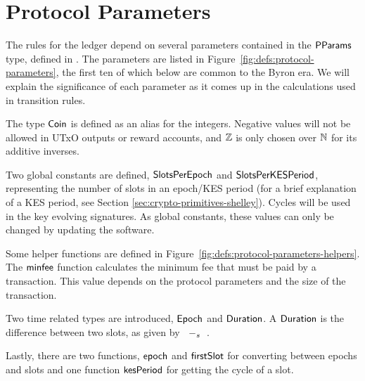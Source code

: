 \section{Protocol Parameters}
\label{sec:protocol-parameters}

The rules for the ledger depend on several parameters contained in the $\mathsf{PParams}$ type,
defined in \cite{byron_ledger_spec}.
The parameters are listed in Figure~\ref{fig:defs:protocol-parameters},
the first ten of which below are common to the Byron era.
We will explain the significance of each parameter as it comes up in
the calculations used in transition rules.

The type $\mathsf{Coin}$ is defined as an alias for the integers.
Negative values will not be allowed in UTxO outputs or reward accounts,
and $\mathbb{Z}$ is only chosen over $\mathbb{N}$ for its additive inverses.

Two global constants are defined, $\mathsf{SlotsPerEpoch}$ and $\mathsf{SlotsPerKESPeriod}$,
representing the number of slots in an epoch/KES period (for a brief explanation
of a KES period, see Section \ref{sec:crypto-primitives-shelley}). Cycles will be used in
the key evolving signatures. As global constants, these values can only be
changed by updating the software.

Some helper functions are defined in Figure~\ref{fig:defs:protocol-parameters-helpers}.
The $\mathsf{minfee}$ function calculates the minimum fee that must be paid by a transaction.
This value depends on the protocol parameters and the size of the transaction.

Two time related types are introduced, $\mathsf{Epoch}$ and $\mathsf{Duration}$.
A $\mathsf{Duration}$ is the difference between two slots, as given by $\mathit{}~-_{s}~\mathit{}$.

Lastly, there are two functions, $\mathsf{epoch}$ and $\mathsf{firstSlot}$ for converting
between epochs and slots and one function $\mathsf{kesPeriod}$ for getting the cycle of a slot.


